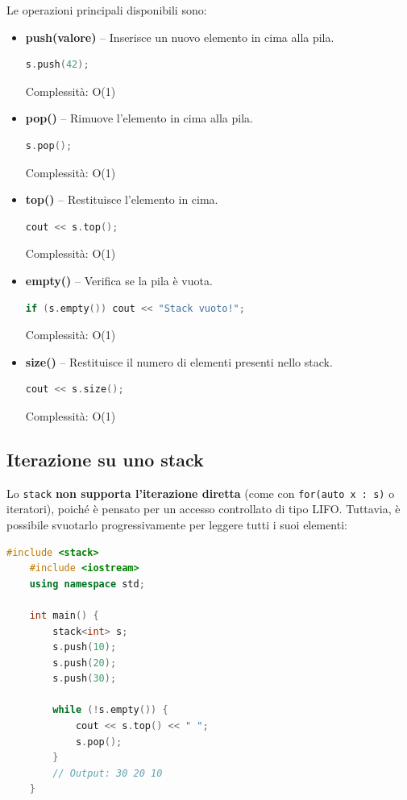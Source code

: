 Le operazioni principali disponibili sono:

\begin{itemize}
	\item \textbf{push(valore)} – Inserisce un nuovo elemento in cima alla pila.
	\begin{lstlisting}[language=C++]
		s.push(42);
	\end{lstlisting}
	Complessità: O(1)
	
	\item \textbf{pop()} – Rimuove l’elemento in cima alla pila.
	\begin{lstlisting}[language=C++]
		s.pop();
	\end{lstlisting}
	Complessità: O(1)
	
	\item \textbf{top()} – Restituisce l’elemento in cima.
	\begin{lstlisting}[language=C++]
		cout << s.top();
	\end{lstlisting}
	Complessità: O(1)
	
	\item \textbf{empty()} – Verifica se la pila è vuota.
	\begin{lstlisting}[language=C++]
		if (s.empty()) cout << "Stack vuoto!";
	\end{lstlisting}
	Complessità: O(1)
	
	\item \textbf{size()} – Restituisce il numero di elementi presenti nello stack.
	\begin{lstlisting}[language=C++]
		cout << s.size();
	\end{lstlisting}
	Complessità: O(1)
\end{itemize}

\subsection{Iterazione su uno stack}

Lo \texttt{stack} \textbf{non supporta l’iterazione diretta} (come con \texttt{for(auto x : s)} o iteratori), poiché è pensato per un accesso controllato di tipo LIFO.  
Tuttavia, è possibile svuotarlo progressivamente per leggere tutti i suoi elementi:

\begin{lstlisting}[language=C++]
	#include <stack>
	#include <iostream>
	using namespace std;
	
	int main() {
		stack<int> s;
		s.push(10);
		s.push(20);
		s.push(30);
		
		while (!s.empty()) {
			cout << s.top() << " ";
			s.pop();
		}
		// Output: 30 20 10
	}
\end{lstlisting}

